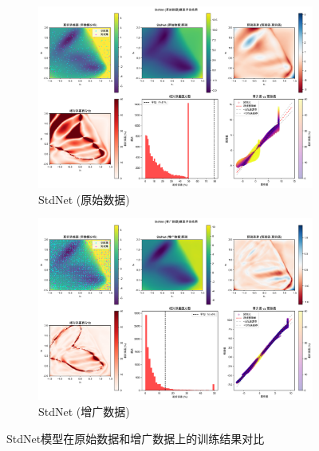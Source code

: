 \documentclass[11pt]{article}
\begin{document}
\begin{figure}[htbp]
    \centering
    \begin{subfigure}[b]{0.8\textwidth}
        \centering
        \includegraphics[width=\textwidth]{results_20250330_150206/figures/StdNet_round1_评估结果.png}
        \caption{StdNet (原始数据)}
        \label{fig:stdnet_round1}
    \end{subfigure}

    \vspace{0.5cm}
    \begin{subfigure}[b]{0.8\textwidth}
        \centering
        \includegraphics[width=\textwidth]{results_20250330_150206/figures/StdNet_round2_评估结果.png}
        \caption{StdNet (增广数据)}
        \label{fig:stdnet_round2}
    \end{subfigure}
    \caption{StdNet模型在原始数据和增广数据上的训练结果对比}
    \label{fig:stdnet_results}
\end{figure}
\end{document}
